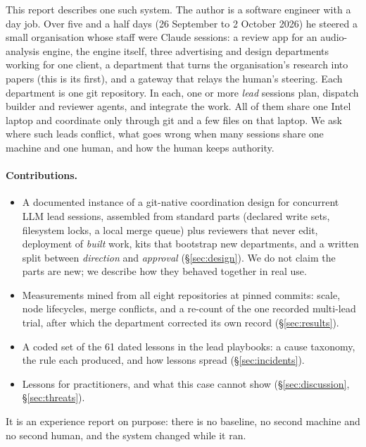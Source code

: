 \documentclass[11pt]{article}
\begin{document}
This report describes one such system. The author is a software engineer with a day job.
Over five and a half days (26 September to 2 October 2026) he steered a small %
organisation whose staff were Claude sessions: a review app for an audio-analysis engine,
the engine itself, three advertising and design departments working for one client, a
department that turns the organisation's research into papers (this is its first), and
a gateway that relays the human's steering. Each department is one git repository. In
each, one or more \emph{lead} sessions plan, dispatch builder and reviewer agents, and
integrate the work. All of them share one Intel laptop and coordinate only through git
and a few files on that laptop. We ask where such leads conflict, what goes wrong when
many sessions share one machine and one human, and how the human keeps authority.

\paragraph{Contributions.}
\begin{itemize}
  \item A documented instance of a git-native coordination design for concurrent LLM lead
    sessions, assembled from standard parts (declared write sets, filesystem locks, a
    local merge queue) plus reviewers that never edit, deployment of \emph{built} work,
    kits that bootstrap new departments, and a written split between \emph{direction}
    and \emph{approval} (\S\ref{sec:design}). We do not claim the parts are new; we
    describe how they behaved together in real use.
  \item Measurements mined from all eight repositories at pinned commits: scale, node
    lifecycles, merge conflicts, and a re-count of the one recorded multi-lead trial,
    after which the department corrected its own record (\S\ref{sec:results}).
  \item A coded set of the 61 dated lessons in the lead playbooks: a cause taxonomy, the %
    rule each produced, and how lessons spread (\S\ref{sec:incidents}).
  \item Lessons for practitioners, and what this case cannot show
    (\S\ref{sec:discussion}, \S\ref{sec:threats}).
\end{itemize}
It is an experience report on purpose: there is no baseline, no second machine and no
second human, and the system changed while it ran.
\end{document}
